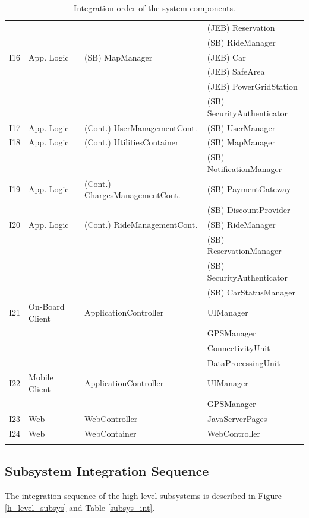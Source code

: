 \begin{longtable}{p{} | p{} | p{} | p{}}
											  & & & (JEB) Reservation \\
											  & & & (SB) RideManager \\
\hline
I16 & App. Logic & (SB) MapManager & (JEB) Car \\
								   & & & (JEB) SafeArea \\ 
								   & & & (JEB) PowerGridStation \\ 
								   & & & (SB) SecurityAuthenticator \\
\hline
I17 & App. Logic & (Cont.) UserManagementCont. & (SB) UserManager \\
\hline
I18 & App. Logic & (Cont.) UtilitiesContainer & (SB) MapManager \\
											  & & & (SB) NotificationManager \\
\hline
I19 & App. Logic & (Cont.) ChargesManagementCont. & (SB) PaymentGateway \\
													  & & & (SB) DiscountProvider \\
\hline
I20 & App. Logic & (Cont.) RideManagementCont. & (SB) RideManager \\ 
												   & & & (SB) ReservationManager \\
												   & & & (SB) SecurityAuthenticator \\
												   & & & (SB) CarStatusManager \\
\hline
I21 & On-Board Client & ApplicationController & UIManager \\
											  & & & GPSManager \\
											  & & & ConnectivityUnit \\
											  & & & DataProcessingUnit \\
\hline
I22 & Mobile Client & ApplicationController & UIManager \\
											& & & GPSManager \\
\hline
I23 & Web & WebController & JavaServerPages \\
\hline
I24 & Web & WebContainer & WebController \\
\hline
\caption{Integration order of the system components.}
\label{software_int}
\end{longtable}
\endgroup

\subsection{Subsystem Integration Sequence}
The integration sequence of the high-level subsystems is described in Figure \ref{h_level_subsys} and Table \ref{subsys_int}.

